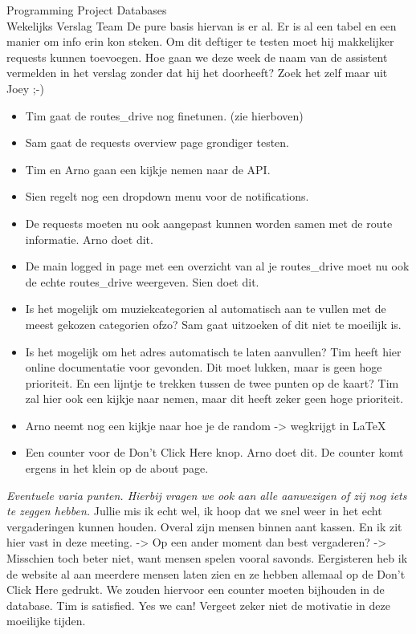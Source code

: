 \documentclass{article}
\newcounter{team}
\begin{document}
\begin{Minutes}{Programming Project Databases \\ Wekelijks Verslag Team }
				    De pure basis hiervan is er al. Er is al een tabel en een manier om info erin kon steken. Om dit deftiger te testen moet hij makkelijker requests kunnen toevoegen.
				    Hoe gaan we deze week de naam van de assistent vermelden in het verslag zonder dat hij het doorheeft? Zoek het zelf maar uit Joey ;-)
			\begin{itemize}
			    \item Tim gaat de routes_drive nog finetunen. (zie hierboven)
			    \item Sam gaat de requests overview page grondiger testen.
			    \item Tim en Arno gaan een kijkje nemen naar de API.
			    \item Sien regelt nog een dropdown menu voor de notifications.
			    \item De requests moeten nu ook aangepast kunnen worden samen met de route informatie. Arno doet dit.
			    \item De main logged in page met een overzicht van al je routes_drive moet nu ook de echte routes_drive weergeven. Sien doet dit.
			    \item Is het mogelijk om muziekcategorien al automatisch aan te vullen met de meest gekozen categorien ofzo? Sam gaat uitzoeken of dit niet te moeilijk is.
			    \item Is het mogelijk om het adres automatisch te laten aanvullen? Tim heeft hier online documentatie voor gevonden. Dit moet lukken, maar is geen hoge prioriteit. En een lijntje te trekken tussen de twee punten op de kaart? Tim zal hier ook een kijkje naar nemen, maar dit heeft zeker geen hoge prioriteit.
			    \item Arno neemt nog een kijkje naar hoe je de random -> wegkrijgt in \LaTeX
			    \item Een counter voor de Don't Click Here knop. Arno doet dit. De counter komt ergens in het klein op de about page.
			\end{itemize}


			\emph{Eventuele varia punten. Hierbij vragen we ook aan alle aanwezigen of zij nog iets te zeggen hebben.}
				    Jullie mis ik echt wel, ik hoop dat we snel weer in het echt vergaderingen kunnen         houden.
				    Overal zijn mensen binnen aant kassen. En ik zit hier vast in deze meeting. -> Op een ander moment dan best vergaderen? -> Misschien toch beter niet, want mensen spelen vooral savonds.
				    Eergisteren heb ik de website al aan meerdere mensen laten zien en ze hebben allemaal op de Don't Click Here gedrukt. We zouden hiervoor een counter moeten bijhouden in de database. Tim is satisfied.
				    Yes we can! Vergeet zeker niet de motivatie in deze moeilijke tijden.



\end{Minutes}
\end{document}
